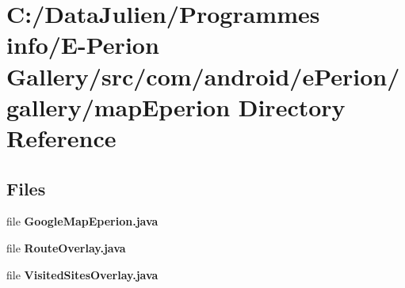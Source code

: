 \section{C\-:/\-Data\-Julien/\-Programmes info/\-E-\/\-Perion Gallery/src/com/android/e\-Perion/gallery/map\-Eperion Directory Reference}
\label{dir_1bd3b393f4674c7455c0f442c3e784c8}
\subsection*{Files}
\begin{DoxyCompactItemize}
\item 
file {\bfseries Google\-Map\-Eperion.\-java}
\item 
file {\bfseries Route\-Overlay.\-java}
\item 
file {\bfseries Visited\-Sites\-Overlay.\-java}
\end{DoxyCompactItemize}
